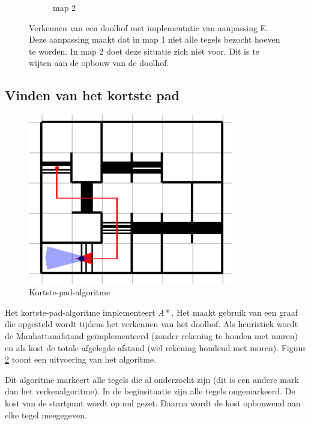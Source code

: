 \documentclass[eind]{penoverslag}
\begin{document}
\begin{figure}
\begin{subfigure}[hb]{0.36\textwidth}
                \caption{map 2}
        \end{subfigure}
 \caption[Verkennen van een doolhof]{Verkennen van een doolhof met implementatie van aanpassing E. Deze aanpassing maakt dat in map 1 niet alle tegels bezocht hoeven te worden. In map 2 doet deze situatie zich niet voor. Dit is te wijten aan de opbouw van de doolhof.}
\label{fig:resultVerkenE}
\end{figure}

\subsection{Vinden van het kortste pad} %
\label{ssec:AlgoKortsteP}

\begin{figure}[tbp]
\begin{center}
    \includegraphics[width=0.8\textwidth]{kortstepadvisual}
    \caption{Kortste-pad-algoritme}
	\label{fig:kortstepad}
\end{center}
\end{figure}

Het kortste-pad-algoritme implementeert \textit{A*} \cite{A*}. Het maakt gebruik van een graaf die opgesteld wordt tijdens het verkennen van het doolhof. Als heuristiek wordt de Manhattanafstand \cite{manhattan} ge\"implementeerd (zonder rekening te houden met muren) en als kost de totale afgelegde afstand (wel rekening houdend met muren). Figuur \ref{fig:kortstepad} toont een uitvoering van het algoritme.

Dit algoritme markeert alle tegels die al onderzocht zijn (dit is een andere mark dan het verkenalgoritme). In de beginsituatie zijn alle tegels ongemarkeerd. De kost van de startpunt wordt op nul gezet. Daarna wordt de kost opbouwend aan elke tegel meegegeven.
\end{document}
